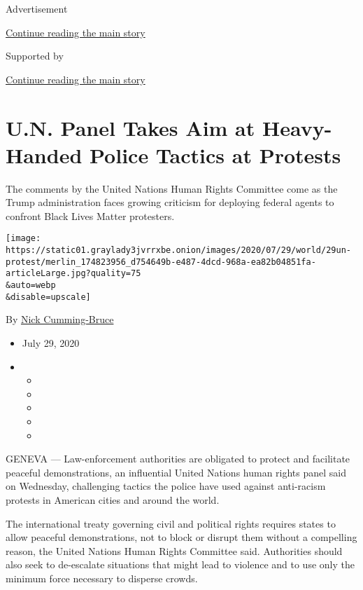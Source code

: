 Advertisement

\protect\hyperlink{after-top}{Continue reading the main story}

Supported by

\protect\hyperlink{after-sponsor}{Continue reading the main story}

\hypertarget{un-panel-takes-aim-at-heavy-handed-police-tactics-at-protests}{%
\section{U.N. Panel Takes Aim at Heavy-Handed Police Tactics at
Protests}\label{un-panel-takes-aim-at-heavy-handed-police-tactics-at-protests}}

The comments by the United Nations Human Rights Committee come as the
Trump administration faces growing criticism for deploying federal
agents to confront Black Lives Matter protesters.

\texttt{[image: https://static01.graylady3jvrrxbe.onion/images/2020/07/29/world/29un-protest/merlin\_174823956\_d754649b-e487-4dcd-968a-ea82b04851fa-articleLarge.jpg?quality=75\\\&auto=webp\\\&disable=upscale]}

By \href{https://www.nytimes3xbfgragh.onion/by/nick-cumming-bruce}{Nick
Cumming-Bruce}

\begin{itemize}
\item
  July 29, 2020
\item
  \begin{itemize}
  \item
  \item
  \item
  \item
  \item
  \end{itemize}
\end{itemize}

GENEVA --- Law-enforcement authorities are obligated to protect and
facilitate peaceful demonstrations, an influential United Nations human
rights panel said on Wednesday, challenging tactics the police have used
against anti-racism protests in American cities and around the world.

The international treaty governing civil and political rights requires
states to allow peaceful demonstrations, not to block or disrupt them
without a compelling reason, the United Nations Human Rights Committee
said. Authorities should also seek to de-escalate situations that might
lead to violence and to use only the minimum force necessary to disperse
crowds.

